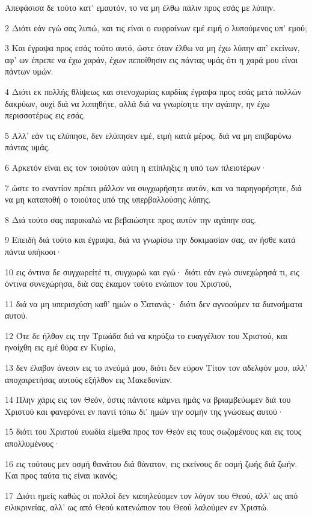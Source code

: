 \par Απεφάσισα δε τούτο κατ' εμαυτόν, το να μη έλθω πάλιν προς εσάς με λύπην.
\par 2 Διότι εάν εγώ σας λυπώ, και τις είναι ο ευφραίνων εμέ ειμή ο λυπούμενος υπ' εμού;
\par 3 Και έγραψα προς εσάς τούτο αυτό, ώστε όταν έλθω να μη έχω λύπην απ' εκείνων, αφ' ων έπρεπε να έχω χαράν, έχων πεποίθησιν εις πάντας υμάς ότι η χαρά μου είναι πάντων υμών.
\par 4 Διότι εκ πολλής θλίψεως και στενοχωρίας καρδίας έγραψα προς εσάς μετά πολλών δακρύων, ουχί διά να λυπηθήτε, αλλά διά να γνωρίσητε την αγάπην, ην έχω περισσοτέρως εις εσάς.
\par 5 Αλλ' εάν τις ελύπησε, δεν ελύπησεν εμέ, ειμή κατά μέρος, διά να μη επιβαρύνω πάντας υμάς.
\par 6 Αρκετόν είναι εις τον τοιούτον αύτη η επίπληξις η υπό των πλειοτέρων·
\par 7 ώστε το εναντίον πρέπει μάλλον να συγχωρήσητε αυτόν, και να παρηγορήσητε, διά να μη καταποθή ο τοιούτος υπό της υπερβαλλούσης λύπης.
\par 8 Διά τούτο σας παρακαλώ να βεβαιώσητε προς αυτόν την αγάπην σας.
\par 9 Επειδή διά τούτο και έγραψα, διά να γνωρίσω την δοκιμασίαν σας, αν ήσθε κατά πάντα υπήκοοι·
\par 10 εις όντινα δε συγχωρείτέ τι, συγχωρώ και εγώ· διότι εάν εγώ συνεχώρησά τι, εις όντινα συνεχώρησα, διά σας έκαμον τούτο ενώπιον του Χριστού,
\par 11 διά να μη υπερισχύση καθ' ημών ο Σατανάς· διότι δεν αγνοούμεν τα διανοήματα αυτού.
\par 12 Ότε δε ήλθον εις την Τρωάδα διά να κηρύξω το ευαγγέλιον του Χριστού, και ηνοίχθη εις εμέ θύρα εν Κυρίω,
\par 13 δεν έλαβον άνεσιν εις το πνεύμά μου, διότι δεν εύρον Τίτον τον αδελφόν μου, αλλ' αποχαιρετήσας αυτούς εξήλθον εις Μακεδονίαν.
\par 14 Πλην χάρις εις τον Θεόν, όστις πάντοτε κάμνει ημάς να βριαμβεύωμεν διά του Χριστού και φανερόνει εν παντί τόπω δι' ημών την οσμήν της γνώσεως αυτού·
\par 15 διότι του Χριστού ευωδία είμεθα προς τον Θεόν εις τους σωζομένους και εις τους απολλυμένους·
\par 16 εις τούτους μεν οσμή θανάτου διά θάνατον, εις εκείνους δε οσμή ζωής διά ζωήν. Και προς ταύτα τις είναι ικανός;
\par 17 Διότι ημείς καθώς οι πολλοί δεν καπηλεύομεν τον λόγον του Θεού, αλλ' ως από ειλικρινείας, αλλ' ως από Θεού κατενώπιον του Θεού λαλούμεν εν Χριστώ.

